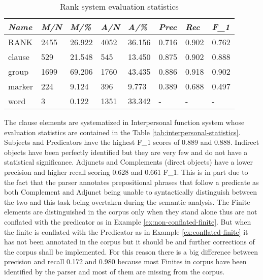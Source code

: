 \begin{table}[H]
	\centering
	\begin{tabulary}{\linewidth}{|L|l|l|l|l|l|l|l|}
		\hline
		\textit{Name} & \textit{M/N} & \textit{M/\%} & \textit{A/N} & \textit{A/\%} & \textit{Prec} & \textit{Rec} & \textit{F_{1}} \\ \hline
		RANK          & 2455       & 26.922          & 4052        & 36.156           & 0.716              & 0.902           & 0.762       \\ \hline
		clause        & 529        & 21.548          & 545         & 13.450           & 
		0.875              & 0.902           & 0.888       \\ \hline
		group         & 1699       & 69.206          & 1760        & 43.435           & 0.886              & 0.918           & 0.902       \\ \hline
		marker        & 224        & 9.124           & 396         & 9.773            & 0.389              & 0.688           & 0.497       \\ \hline
		word          & 3          & 0.122           & 1351        & 33.342           & -              & -           & -      \\ \hline
	\end{tabulary}
	\caption{Rank system evaluation statistics}
	\label{tab:rank-statistics}
\end{table}

The clause elements are systematized in Interpersonal function system whose evaluation statistics are contained in the Table \ref{tab:interpersonal-statistics}. Subjects and Predicators have the highest F_{1} scores of 0.889 and 0.888. Indirect objects have been perfectly identified but they are very few and do not have a statistical significance. Adjuncts and Complements (direct objects) have a lower precision and higher recall scoring 0.628 and 0.661 F_{1}. This is in part due to the fact that the parser annotates prepositional phrases that follow a predicate as both Complement and Adjunct being unable to syntactically distinguish between the two and this task being overtaken during the semantic analysis. The Finite elements are distinguished in the corpus only when they stand alone thus are not conflated with the predicator as in Example \ref{ex:non-conflated-finite}. But when the finite is conflated with the Predicator as in Example \ref{ex:conflated-finite} it has not been annotated in the corpus but it should be and further corrections of the corpus shall be implemented. For this reason there is a big difference between precision and recall 0.172 and 0.980 because most Finites in corpus have been identified by the parser and most of them are missing from the corpus. 

